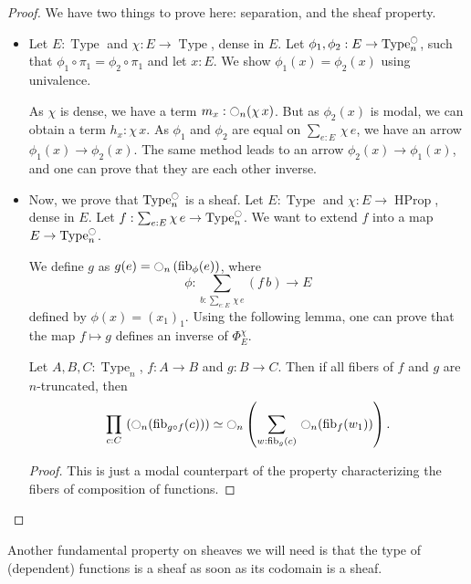 \documentclass[notfinal]{jfrarticle}
\DeclareMathOperator{\Type}{Type}
\DeclareMathOperator{\HProp}{HProp}
\newcommand{\modal}{\ensuremath{\ocircle}}
\newcommand \fib[2] {\mathrm{fib}_{#1}(#2)}
\newcommand{\sumD}[3]{\sum_{#1:#2}\, #3}
\newcommand{\prodD}[3]{\prod_{#1:#2}\, #3}
\newcommand{\code}[1]{\texttt{#1}}
\begin{document}
\begin{proof}
  We have two things to prove here: separation, and the sheaf property.
  \begin{itemize}
  \item Let $E:\Type$ and $\chi:E\to\Type$, dense in $E$. 
    Let $\phi_1,\phi_2:E \to
    \Type_n^\modal$, such that $\phi_1 \circ \pi_1 = \phi_2 \circ
    \pi_1$ and let $x:E$. We show $\phi_1(x) = \phi_2(x)$ using
    univalence.
    
    As $\chi$ is dense, we have a term $m_x : \modal_n(\chi\, x)$.
    But as $\phi_2(x)$ is modal, we can obtain a term $h_x : \chi\,
    x$. 
    As $\phi_1$ and $\phi_2$ are equal on $\sumD e E {\chi\, e}$, we
    have an arrow $\phi_1(x) \to \phi_2(x)$.
    The same method leads to an arrow $\phi_2 (x) \to \phi_1 (x)$, and
    one can
    prove that they are each other inverse.
  \item Now, we prove that $\Type_n^\modal$ is a sheaf. Let $E:\Type$ and
  $\chi:E \to \HProp$, dense in $E$. Let $f:\sum_{e:E} \chi\, e \to
  \Type_n^\modal$. We want to extend $f$ into a map $E \to \Type_n^\modal$.

  We define $g$ as $g(e) = \modal_n \left( \fib \phi {e} \right)$,
  where
  \[ \phi : \sum_{b:\sumD e E {\chi\, e}} (f\,
    b) \to E\]
  defined by $\phi(x) = (x_1)_1$.
  Using the following lemma, one can prove that the map $f\mapsto g$
  defines an inverse of $\Phi_E^\chi$.
  \begin{lem}[\thethm\ (\code{nj\_fibers\_compose})]
    Let $A,B,C:\Type_n$, $f:A\to B$ and $g:B\to C$.
    Then
    if all fibers of $f$ and $g$ are $n$-truncated, then
      \[\prodD c C {\left( \modal_n(\fib {g \circ f} c) \right) \simeq
      \modal_n \left(  
        \sumD w {\fib g c} {\modal_n (\fib f {w_1})}
      \right)}.\]
  \end{lem}
  \begin{proof}
    This is just a modal counterpart of the property characterizing
    the fibers of composition of functions.
  \end{proof}
  \end{itemize}
\end{proof}

Another fundamental property on sheaves we will need is that the type of (dependent)
functions is a sheaf as soon as its codomain is a sheaf.
\end{document}
